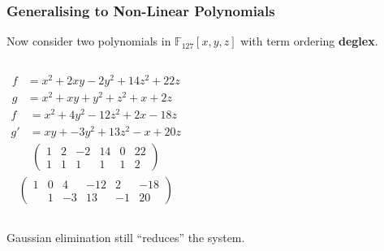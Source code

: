 \documentclass[9pt]{beamer}
\newcommand{\F}[1][]{\ensuremath{\mathbb{F}_{#1}}\xspace}
\begin{document}
\begin{frame}
\frametitle{Generalising to Non-Linear Polynomials}
Now consider two polynomials in $\F[127][x,y,z]$ with term ordering \textbf{deglex}.

\begin{columns}
\begin{align*}
f &= x^2 + 2xy - 2y^2 + 14z^2 + 22z\\
g &= x^2 + xy + y^2 + z^2 + x + 2z
\end{align*}
\begin{align*}
f &= x^2 + 4 y^2  -12 z^2 + 2 x - 18 z \\
g'&= x y + -3 y^{2} + 13 z^{2} - x + 20 z
\end{align*}
\begin{align*}
\left(\begin{array}{rrrrrr}
1 & 2 & -2 & 14 & 0 & 22 \\
1 & 1 &  1 &  1 & 1 &  2
\end{array}\right)
\end{align*}
\begin{align*}
\left(\begin{array}{rrrrrr}
1 & 0 &  4 & -12 &  2 & -18 \\
  & 1 & -3 &  13 & -1 &  20
\end{array}\right)
\end{align*}
\end{columns}

\vspace{1em}

\begin{block}{}
Gaussian elimination still ``reduces'' the system.
\end{block}
\end{frame}
\end{document}
